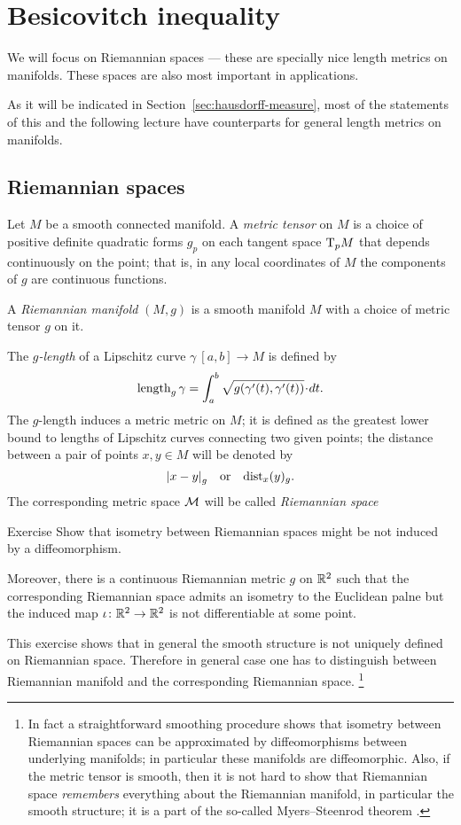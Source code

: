\chapter{Besicovitch inequality} 

We will focus on Riemannian spaces --- these are specially nice length metrics on manifolds.
These spaces are also most important in applications.

As it will be indicated in Section~\ref{sec:hausdorff-measure},
most of the statements of this and the following lecture have counterparts for general length metrics on manifolds.

\section{Riemannian spaces}

Let $M$ be a smooth connected manifold.
A \emph{metric tensor} on $M$ is a choice of positive definite quadratic forms $g_p$ on each tangent space $\mathrm{T}_pM$ that depends continuously on the point;
that is, in any local coordinates of $M$ the components of $g$ are continuous functions.

A \emph{Riemannian manifold} $(M,g)$ is a smooth manifold $M$ with a choice of metric tensor $g$ on it.

The \emph{$g$-length} of a Lipschitz curve $\gamma\:[a,b]\to M$  is defined by
\[\length_g\gamma=\int_a^b\sqrt{g(\gamma'(t),\gamma'(t))}\cdot dt.\]
The $g$-length induces a metric metric on $M$; it is defined as the greatest lower bound to lengths of Lipschitz curves connecting two given points;
the distance between a pair of points $x,y\in M$ will be denoted by 
\[\dist{x}{y}{g}\quad\text{or}\quad\distfun_x(y)_g.\]
The corresponding metric space $\mathcal{M}$ will be called \emph{Riemannian space}

\begin{thm}{Exercise}\label{ex:non-differentiable}
Show that isometry between Riemannian spaces might be not induced by a diffeomorphism.

Moreover, there is a continuous Riemannian metric $g$ on $\mathbb{R}^2$ such that the corresponding Riemannian space admits an isometry to the Euclidean palne but the induced map $\iota\colon\mathbb{R}^2\to\mathbb{R}^2$ is not differentiable at some point.
\end{thm}

This exercise shows that in general the smooth structure is not uniquely defined on Riemannian space.
Therefore in general case one has to distinguish between Riemannian manifold and the corresponding Riemannian space.%
\footnote{In fact a straightforward smoothing procedure shows that isometry between Riemannian spaces can be approximated by diffeomorphisms between underlying manifolds; in particular these manifolds are diffeomorphic.
Also, if the metric tensor is smooth, then it is not hard to show that Riemannian space {}\emph{remembers} everything about the Riemannian manifold, in particular the smooth structure;
it is a part of the so-called Myers--Steenrod theorem \cite{myers-steenrod}.}

